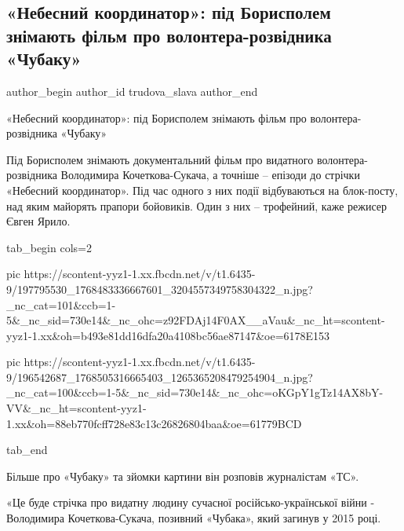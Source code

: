  
 
 
 
 
 
\subsection{«Небесний координатор»: під Борисполем знімають фільм про волонтера-розвідника «Чубаку»}
\label{sec:10_06_2021.fb.trudova_slava.1.borispol_film_sjemki}
 
\ifcmt
 author_begin
   author_id trudova_slava
 author_end
\fi

«Небесний координатор»: під Борисполем знімають фільм про волонтера-розвідника
«Чубаку»

Під Борисполем знімають документальний фільм про видатного волонтера-розвідника
Володимира Кочеткова-Сукача, а точніше – епізоди до стрічки «Небесний
координатор». Під час одного з них події відбуваються на блок-посту, над яким
майорять прапори бойовиків. Один з них – трофейний, каже режисер Євген Ярило.

\ifcmt
  tab_begin cols=2

     pic https://scontent-yyz1-1.xx.fbcdn.net/v/t1.6435-9/197795530_1768483336667601_3204557349758304322_n.jpg?_nc_cat=101&ccb=1-5&_nc_sid=730e14&_nc_ohc=z92FDAj14F0AX__aVau&_nc_ht=scontent-yyz1-1.xx&oh=b493e81dd16dfa20a4108bc56ae87147&oe=6178E153

     pic https://scontent-yyz1-1.xx.fbcdn.net/v/t1.6435-9/196542687_1768505316665403_1265365208479254904_n.jpg?_nc_cat=100&ccb=1-5&_nc_sid=730e14&_nc_ohc=oKGpY1gTz14AX8bY-VV&_nc_ht=scontent-yyz1-1.xx&oh=88eb770fcff728e83c13c26826804baa&oe=61779BCD

  tab_end
\fi

Більше про «Чубаку» та зйомки картини він розповів журналістам «ТС».

«Це буде стрічка про видатну людину сучасної російсько-української війни -
Володимира Кочеткова-Сукача, позивний «Чубака», який загинув у 2015 році.

